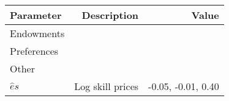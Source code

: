 \begin{tabular}{lrr}
\hline
Parameter & Description  & Value  \\
\hline
Endowments &   &   \\
Preferences &   &   \\
Other &   &   \\
$\hat{e}{s}$ & Log skill prices  & -0.05, -0.01, 0.40  \\
\hline
\end{tabular}%
